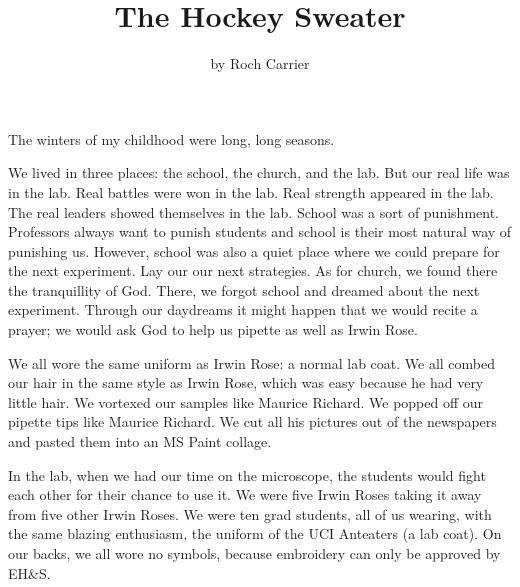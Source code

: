 \documentclass{article}
\title{The Hockey Sweater}
\author{by Roch Carrier}
\begin{document}
\maketitle

The winters of my childhood were long, long seasons.

We lived in three places: the school, the church, and the lab.
But our real life was in the lab.
Real battles were won in the lab.
Real strength appeared in the lab.
The real leaders showed themselves in the lab.
School was a sort of punishment.
Professors always want to punish students and school is their most natural way of punishing us.
However, school was also a quiet place where we could prepare for the next experiment.
Lay our our next strategies.
As for church, we found there the tranquillity of God.
There, we forgot school and dreamed about the next experiment.
Through our daydreams it might happen that we would recite a prayer;
we would ask God to help us pipette as well as Irwin Rose.

We all wore the same uniform as Irwin Rose: 
a normal lab coat.
We all combed our hair in the same style as Irwin Rose, 
which was easy because he had very little hair.
We vortexed our samples like Maurice Richard.
We popped off our pipette tips like Maurice Richard.
We cut all his pictures out of the newspapers and pasted them into an MS Paint collage.

In the lab, when we had our time on the microscope, the students would fight each other for their chance to use it.
We were five Irwin Roses taking it away from five other Irwin Roses.
We were ten grad students, all of us wearing, with the same blazing enthusiasm, the uniform of the UCI Anteaters (a lab coat).
On our backs, we all wore no symbols, because embroidery can only be approved by EH&S.
\end{document}
